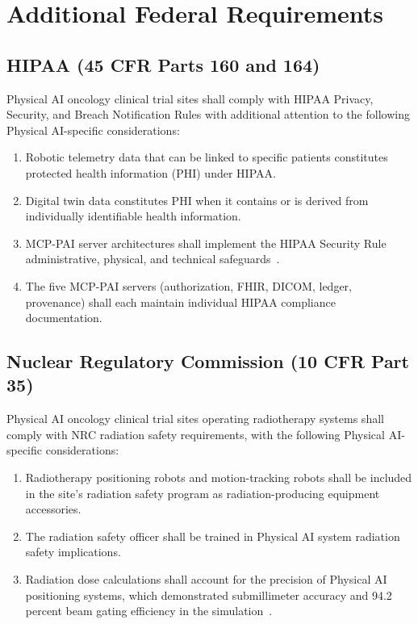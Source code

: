 \documentclass[11pt,letterpaper]{article}
\begin{document}
\section{Additional Federal Requirements}

\subsection{HIPAA (45 CFR Parts 160 and 164)}

Physical AI oncology clinical trial sites shall comply with HIPAA Privacy,
Security, and Breach Notification Rules with additional attention to the
following Physical AI-specific considerations:

\begin{enumerate}[label=(\alph*)]
\item Robotic telemetry data that can be linked to specific patients
  constitutes protected health information (PHI) under HIPAA.
\item Digital twin data constitutes PHI when it contains or is derived from
  individually identifiable health information.
\item MCP-PAI server architectures shall implement the HIPAA Security Rule
  administrative, physical, and technical safeguards~\cite{iche6r3adapt}.
\item The five MCP-PAI servers (authorization, FHIR, DICOM, ledger,
  provenance) shall each maintain individual HIPAA compliance
  documentation.
\end{enumerate}

\subsection{Nuclear Regulatory Commission (10 CFR Part 35)}

Physical AI oncology clinical trial sites operating radiotherapy systems
shall comply with NRC radiation safety requirements, with the following
Physical AI-specific considerations:

\begin{enumerate}[label=(\alph*)]
\item Radiotherapy positioning robots and motion-tracking robots shall be
  included in the site's radiation safety program as radiation-producing
  equipment accessories.
\item The radiation safety officer shall be trained in Physical AI system
  radiation safety implications.
\item Radiation dose calculations shall account for the precision of Physical
  AI positioning systems, which demonstrated submillimeter accuracy and 94.2
  percent beam gating efficiency in the
  simulation~\cite{newtrial2026}.
\end{enumerate}
\end{document}
